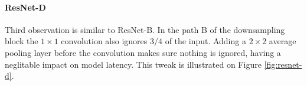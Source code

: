 \paragraph{ResNet-D}
Third observation is similar to ResNet-B. In the path B of the downsampling block the $1 \times 1$ convolution also ignores $3/4$ of the input. Adding a $2 \times 2$ average pooling layer before the convolution makes sure nothing is ignored, having a neglitable impact on model latency. This tweak is illustrated on Figure \ref{fig:resnet-d}.

\begin{figure}[t!]
  \centering
  \hfill%
\end{figure}
